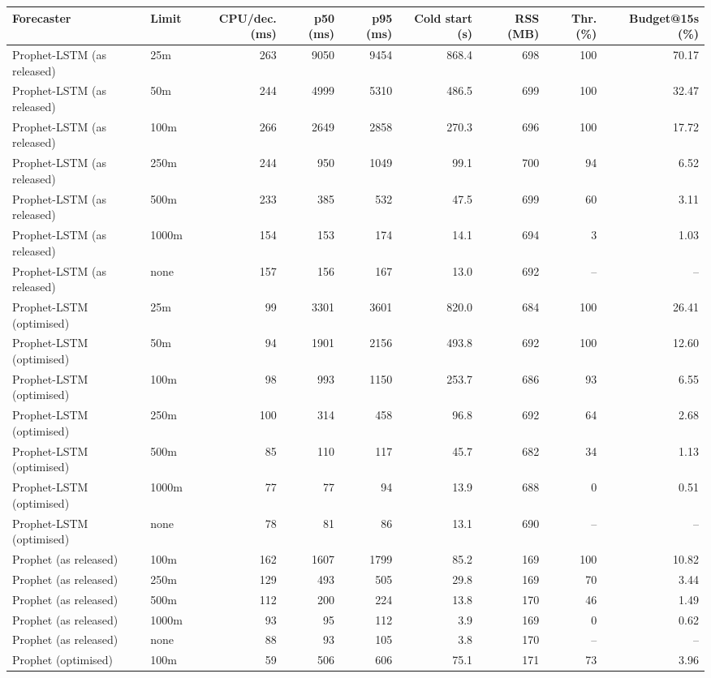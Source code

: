 \begin{tabular}{llrrrrrrr}
\toprule
Forecaster & Limit & CPU/dec. (ms) & p50 (ms) & p95 (ms) & Cold start (s) & RSS (MB) & Thr. (\%) & Budget@15s (\%) \\
\midrule
Prophet-LSTM (as released) & 25m & 263 & 9050 & 9454 & 868.4 & 698 & 100 & 70.17 \\
Prophet-LSTM (as released) & 50m & 244 & 4999 & 5310 & 486.5 & 699 & 100 & 32.47 \\
Prophet-LSTM (as released) & 100m & 266 & 2649 & 2858 & 270.3 & 696 & 100 & 17.72 \\
Prophet-LSTM (as released) & 250m & 244 & 950 & 1049 & 99.1 & 700 & 94 & 6.52 \\
Prophet-LSTM (as released) & 500m & 233 & 385 & 532 & 47.5 & 699 & 60 & 3.11 \\
Prophet-LSTM (as released) & 1000m & 154 & 153 & 174 & 14.1 & 694 & 3 & 1.03 \\
Prophet-LSTM (as released) & none & 157 & 156 & 167 & 13.0 & 692 & -- & -- \\
Prophet-LSTM (optimised) & 25m & 99 & 3301 & 3601 & 820.0 & 684 & 100 & 26.41 \\
Prophet-LSTM (optimised) & 50m & 94 & 1901 & 2156 & 493.8 & 692 & 100 & 12.60 \\
Prophet-LSTM (optimised) & 100m & 98 & 993 & 1150 & 253.7 & 686 & 93 & 6.55 \\
Prophet-LSTM (optimised) & 250m & 100 & 314 & 458 & 96.8 & 692 & 64 & 2.68 \\
Prophet-LSTM (optimised) & 500m & 85 & 110 & 117 & 45.7 & 682 & 34 & 1.13 \\
Prophet-LSTM (optimised) & 1000m & 77 & 77 & 94 & 13.9 & 688 & 0 & 0.51 \\
Prophet-LSTM (optimised) & none & 78 & 81 & 86 & 13.1 & 690 & -- & -- \\
Prophet (as released) & 100m & 162 & 1607 & 1799 & 85.2 & 169 & 100 & 10.82 \\
Prophet (as released) & 250m & 129 & 493 & 505 & 29.8 & 169 & 70 & 3.44 \\
Prophet (as released) & 500m & 112 & 200 & 224 & 13.8 & 170 & 46 & 1.49 \\
Prophet (as released) & 1000m & 93 & 95 & 112 & 3.9 & 169 & 0 & 0.62 \\
Prophet (as released) & none & 88 & 93 & 105 & 3.8 & 170 & -- & -- \\
Prophet (optimised) & 100m & 59 & 506 & 606 & 75.1 & 171 & 73 & 3.96 \\

\end{tabular}
